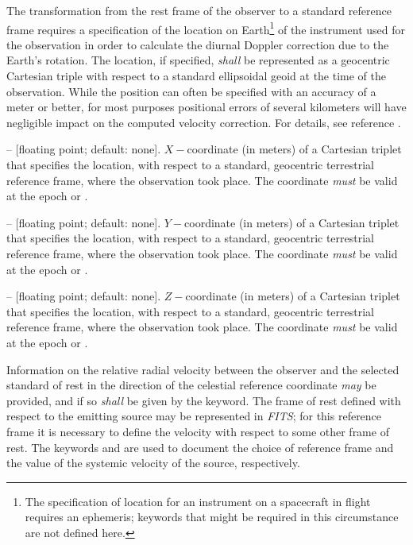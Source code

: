 \documentclass[onecolumn]{aa}
\begin{document}

The transformation from the rest frame of the
observer to a standard reference frame requires a specification of the location on
Earth\footnote{The specification of location for an instrument on a spacecraft in flight
requires an ephemeris; keywords that might be required in this circumstance are not defined
here.} of the instrument used for the observation in order to calculate the
diurnal Doppler correction due to the Earth's rotation.
The location, if specified, {\em shall}
be represented as a geocentric Cartesian triple with respect to a standard ellipsoidal geoid
at the time of the observation.  While the position can often be specified with an accuracy 
of a meter or better, for most purposes positional errors of several kilometers will have 
negligible impact on the computed velocity correction.
For details, see reference \cite{greisen06}.

\begin{description}

\item {} -- [floating point; default: none]. $X-$coordinate (in meters) of a
Cartesian triplet that specifies the location, with respect to a standard, geocentric
terrestrial reference frame, where the observation took place. The coordinate {\em must} be
valid at the epoch  or .

\item {} -- [floating point; default: none]. $Y-$coordinate (in meters) of a
Cartesian triplet that specifies the location, with respect to a standard, geocentric
terrestrial reference frame, where the observation took place. The coordinate {\em must} be
valid at the epoch  or .

\item {} -- [floating point; default: none]. $Z-$coordinate (in meters) of a
Cartesian triplet that specifies the location, with respect to a standard, geocentric
terrestrial reference frame, where the observation took place. The coordinate {\em must} be
valid at the epoch  or .

\end{description}

Information on the relative radial velocity between the observer and the selected standard of
rest in the direction of the celestial reference coordinate {\em may} be provided, and if so
{\em shall} be given by the  keyword.
The frame of rest defined with respect to the emitting source may be represented in {\em FITS\/}; for
this reference frame it is necessary to define the velocity with respect to some other frame
of rest. The keywords  and  are used to document the choice
of reference frame and the value of the systemic velocity of the source, respectively.
\end{document}
